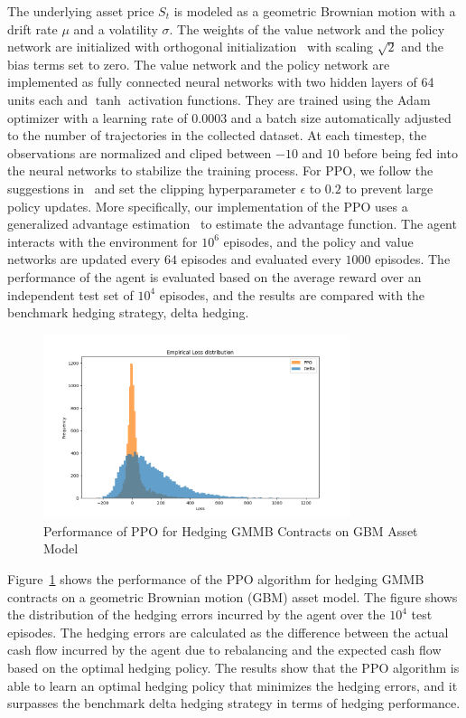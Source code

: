 The underlying asset price $S_t$ is modeled as a geometric Brownian motion with a drift rate $\mu$ and a volatility $\sigma$.
The weights of the value network and the policy network are initialized with orthogonal initialization~\citep{engstrom2020implementation} with scaling $\sqrt{2}$ and the bias terms set to zero.
The value network and the policy network are implemented as fully connected neural networks with two hidden layers of 64 units each and $\tanh$ activation functions.
They are trained using the Adam optimizer with a learning rate of $0.0003$ and a batch size automatically adjusted to the number of trajectories in the collected dataset.
At each timestep, the observations are normalized and cliped between $-10$ and $10$ before being fed into the neural networks to stabilize the training process.
For PPO, we follow the suggestions in~\cite{schulman2017proximal} and set the clipping hyperparameter $\epsilon$ to $0.2$ to prevent large policy updates. 
More specifically, our implementation of the PPO uses a generalized advantage estimation~\citep{schulman2015high} to estimate the advantage function.
The agent interacts with the environment for $10^6$ episodes, and the policy and value networks are updated every $64$ episodes and evaluated every $1000$ episodes.
The performance of the agent is evaluated based on the average reward over an independent test set of $10^4$ episodes, and the results are compared with the benchmark hedging strategy, delta hedging.

\begin{figure}
    \centering
    \includegraphics[width=0.8\textwidth]{./project3/figures/loss_distribution.png}
    \caption{Performance of PPO for Hedging GMMB Contracts on GBM Asset Model} 
    \label{fig3:ppo_hedging}
\end{figure}

Figure~\ref{fig3:ppo_hedging} shows the performance of the PPO algorithm for hedging GMMB contracts on a geometric Brownian motion (GBM) asset model.
The figure shows the distribution of the hedging errors incurred by the agent over the $10^4$ test episodes.
The hedging errors are calculated as the difference between the actual cash flow incurred by the agent due to rebalancing and the expected cash flow based on the optimal hedging policy.
The results show that the PPO algorithm is able to learn an optimal hedging policy that minimizes the hedging errors, and it surpasses the benchmark delta hedging strategy in terms of hedging performance.


